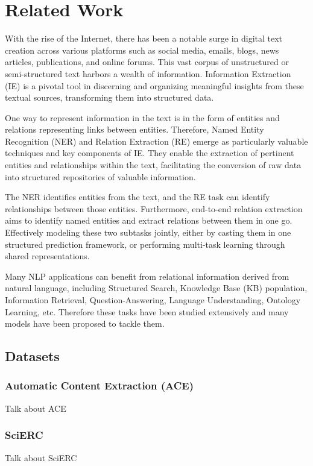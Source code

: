 \chapter{Related Work}
\label{chp:relatedWork}

With the rise of the Internet, there has been a notable surge in digital text creation across various platforms such as social media, emails, blogs, news articles, publications, and online forums. This vast corpus of unstructured or semi-structured text harbors a wealth of information. Information Extraction (IE) is a pivotal tool in discerning and organizing meaningful insights from these textual sources, transforming them into structured data.

One way to represent information in the text is in the form of entities and relations representing links between entities. Therefore, Named Entity Recognition (NER) and Relation Extraction (RE) emerge as particularly valuable techniques and key components of IE. They enable the extraction of pertinent entities and relationships within the text, facilitating the conversion of raw data into structured repositories of valuable information.

The NER identifies entities from the text, and the RE task can identify relationships between those entities. Furthermore, end-to-end relation extraction aims to identify named entities and extract relations between them in one go. Effectively modeling these two subtasks jointly\cite{Zhong2020AFE}, either by casting them in one structured prediction framework, or performing multi-task learning through shared representations.

Many NLP applications can benefit from relational information derived from natural language\cite{Goyal2018RNE}, including Structured Search, Knowledge Base (KB) population, Information Retrieval, Question-Answering, Language Understanding, Ontology Learning, etc. Therefore these tasks have been studied extensively and many models have been proposed to tackle them.

\section{Datasets}
\subsection{Automatic Content Extraction (ACE)}
Talk about ACE
\subsection{SciERC}
Talk about SciERC
